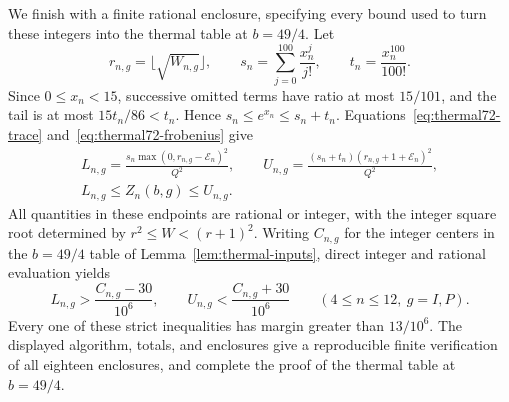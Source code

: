 We finish with a finite rational enclosure, specifying every bound used
to turn these integers into the thermal table at $b=49/4$. Let
\[
 r_{n,g}=\lfloor\sqrt{W_{n,g}}\rfloor,\qquad
 s_n=\sum_{j=0}^{100}\frac{x_n^j}{j!},\qquad
 t_n=\frac{x_n^{100}}{100!}.
\]
Since \(0\le x_n<15\), successive omitted terms have ratio at most
\(15/101\), and the tail is at most \(15t_n/86<t_n\). Hence
\(s_n\le e^{x_n}\le s_n+t_n\).
Equations~\eqref{eq:thermal72-trace} and~\eqref{eq:thermal72-frobenius}
give
\begin{equation}\label{eq:thermal72-enclosure}
 \begin{gathered}
 L_{n,g}=\frac{s_n\max(0,r_{n,g}-\mathcal E_n)^2}{Q^2},\qquad
 U_{n,g}=\frac{(s_n+t_n)(r_{n,g}+1+\mathcal E_n)^2}{Q^2},\\
 L_{n,g}\le Z_n(b,g)\le U_{n,g}.
 \end{gathered}
\end{equation}
All quantities in these endpoints are rational or integer, with the
integer square root determined by \(r^2\le W<(r+1)^2\).
Writing \(C_{n,g}\) for the integer centers in the $b=49/4$ table of
Lemma~\ref{lem:thermal-inputs}, direct integer and rational evaluation yields
\[
 L_{n,g}>\frac{C_{n,g}-30}{10^6},
 \qquad
 U_{n,g}<\frac{C_{n,g}+30}{10^6}
 \qquad(4\le n\le12,\ g=I,P).
\]
Every one of these strict inequalities has margin greater than
\(13/10^6\). The displayed algorithm, totals, and enclosures give a
reproducible finite verification of all eighteen enclosures, and
complete the proof of the thermal table at $b=49/4$.

